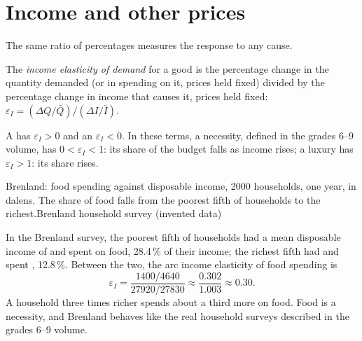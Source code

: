 \section{Income and other prices}\label{sec:g10:elasticities:income}

The same ratio of percentages measures the response to any cause.

\begin{definition}\label{def:g10:elasticities:income}
The \emph{income elasticity of demand} for a good is the percentage change in the quantity demanded (or in
spending on it, prices held fixed) divided by the percentage change in income that causes it, prices held fixed:
$\varepsilon_I = (\Delta Q/\bar Q)/(\Delta I/\bar I)$.
\end{definition}

A  has $\varepsilon_I > 0$ and an  $\varepsilon_I < 0$. In these terms, a necessity, defined in the grades 6--9 volume,
has $0 < \varepsilon_I < 1$: its share of the budget falls as income rises; a luxury has $\varepsilon_I > 1$: its share rises.

\begin{omchart}{Brenland: food spending against disposable income, \num{2000} households, one year, in dalens. The share of food falls from
the poorest fifth of households to the richest.}{Brenland household survey (invented data)}
\end{omchart}

In the Brenland survey, the poorest fifth of households had a mean disposable income of  and spent  on food, 28.4\,\% of their
income; the richest fifth had  and spent , 12.8\,\%. Between the two, the arc income elasticity of food spending is
\[
  \varepsilon_I = \frac{1400/4640}{27920/27830} \approx \frac{0.302}{1.003} \approx 0.30 .
\]
A household three times richer spends about a third more on food. Food is a necessity, and Brenland behaves like the real household surveys
described in the grades 6--9 volume.

